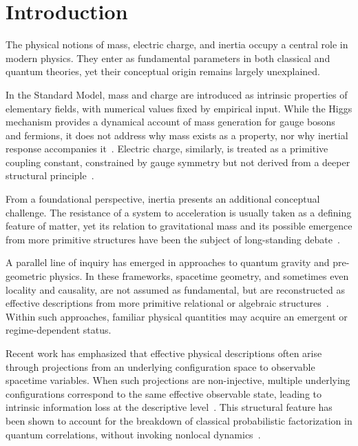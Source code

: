 \documentclass[pdflatex,sn-mathphys-num]{sn-jnl} %
\theoremstyle{remark}
\begin{document}
  \section{Introduction}
    \label{sec:introduction}

    The physical notions of mass, electric charge, and inertia occupy a central role
    in modern physics.
    They enter as fundamental parameters in both classical and quantum theories,
    yet their conceptual origin remains largely unexplained.

    In the Standard Model, mass and charge are introduced as intrinsic properties of
    elementary fields, with numerical values fixed by empirical input.
    While the Higgs mechanism provides a dynamical account of mass generation for
    gauge bosons and fermions, it does not address why mass exists as a property, nor
    why inertial response accompanies it~\cite{Higgs1964}.
    Electric charge, similarly, is treated as a primitive coupling constant,
    constrained by gauge symmetry but not derived from a deeper structural
    principle~\cite{PeskinSchroeder}.

    From a foundational perspective, inertia presents an additional conceptual
    challenge.
    The resistance of a system to acceleration is usually taken as a defining
    feature of matter, yet its relation to gravitational mass and its possible
    emergence from more primitive structures have been the subject of long-standing
    debate~\cite{Mach1893,Einstein1916}.

    A parallel line of inquiry has emerged in approaches to quantum gravity and
    pre-geometric physics.
    In these frameworks, spacetime geometry, and sometimes even locality and
    causality, are not assumed as fundamental, but are reconstructed as effective
    descriptions from more primitive relational or algebraic
    structures~\cite{Rovelli2004,AmelinoCamelia2013}.
    Within such approaches, familiar physical quantities may acquire an emergent or
    regime-dependent status.

    Recent work has emphasized that effective physical descriptions often arise
    through projections from an underlying configuration space to observable
    spacetime variables.
    When such projections are non-injective, multiple underlying configurations
    correspond to the same effective observable state, leading to intrinsic
    information loss at the descriptive level~\cite{Beau2026b}.
    This structural feature has been shown to account for the breakdown of classical
    probabilistic factorization in quantum correlations, without invoking nonlocal
    dynamics~\cite{Bell1964}.
\end{document}
